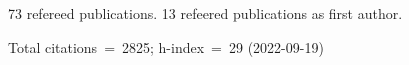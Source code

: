 73 refereed publications. 13 refeered publications as first author.

Total citations~=~2825; h-index~=~29 (2022-09-19)